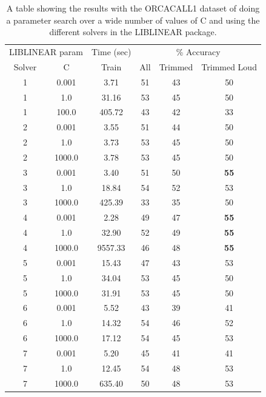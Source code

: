 \begin{table}
\begin{tabular}{|c|c|c|c|c|c|}
\hline
\multicolumn{2}{|c|}{LIBLINEAR param} & \multicolumn{1}{c|}{Time (sec)} & \multicolumn{3}{c|}{\% Accuracy} \\
\hhline{|-|-|-|-|-|-|}
Solver & C & Train & All & Trimmed & Trimmed Loud \\
\hhline{|=|=|=|=|=|=|}
1 & 0.001   &       3.71  &    51  &  43  &  50 \\
1 & 1.0     &      31.16  &    53  &  45  &  50 \\
1 & 100.0   &     405.72  &    43  &  42  &  33 \\
2 & 0.001   &       3.55  &    51  &  44  &  50 \\
2 & 1.0     &       3.73  &    53  &  45  &  50 \\
2 & 1000.0  &       3.78  &    53  &  45  &  50 \\
\hline
3 & 0.001   &       3.40  &    51  &  50  &  \textbf{55} \\
3 & 1.0     &      18.84  &    54  &  52  &  53 \\
3 & 1000.0  &     425.39  &    33  &  35  &  50 \\
4 & 0.001   &       2.28  &    49  &  47  &  \textbf{55} \\
4 & 1.0     &      32.90  &    52  &  49  &  \textbf{55} \\
4 & 1000.0  &    9557.33  &    46  &  48  &  \textbf{55} \\
\hline
5 & 0.001   &      15.43  &    47   &  43  &  53 \\
5 & 1.0     &      34.04  &    53   &  45  &  50 \\
5 & 1000.0  &      31.91  &    53   &  45  &  50 \\
6 & 0.001   &       5.52  &    43   &  39  &  41 \\
6 & 1.0     &      14.32  &    54   &  46  &  52 \\
6 & 1000.0  &      17.12  &    54   &  45  &  53 \\
7 & 0.001   &       5.20  &    45   &  41  &  41 \\
7 & 1.0     &      12.45  &    54   &  48  &  53 \\
7 & 1000.0  &     635.40  &    50   &  48  &  53 \\
\hline
\end{tabular}
\caption{A table showing the results with the ORCACALL1 dataset of
  doing a parameter search over a wide number of values of C and using
  the different solvers in the LIBLINEAR package.}
\label{table:calls-liblinear}
\end{table}

